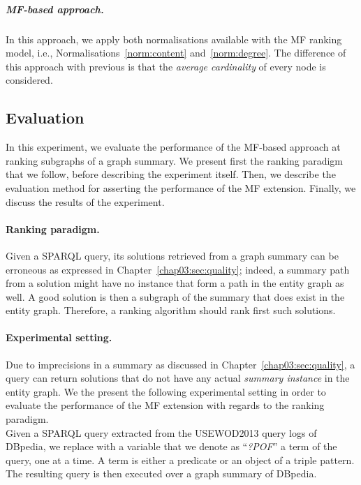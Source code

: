 \subparagraph{MF-based approach.}

In this approach, we apply both normalisations available with the MF ranking model, i.e., Normalisations~\ref{norm:content} and~\ref{norm:degree}. The difference of this approach with previous is that the \emph{average cardinality} of every node is considered.

\subsection{Evaluation}
\label{sec:summary-ranking:eval}

In this experiment, we evaluate the performance of the MF-based approach at ranking subgraphs of a graph summary. We present first the ranking paradigm that we follow, before describing the experiment itself. Then, we describe the evaluation method for asserting the performance of the MF extension. Finally, we discuss the results of the experiment.

\paragraph{Ranking paradigm.}

Given a SPARQL query, its solutions retrieved from a graph summary can be erroneous as expressed in Chapter~\ref{chap03:sec:quality}; indeed, a summary path from a solution might have no instance that form a path in the entity graph as well. A good solution is then a subgraph of the summary that does exist in the entity graph. Therefore, a ranking algorithm should rank first such solutions.

\paragraph{Experimental setting.}

Due to imprecisions in a summary as discussed in Chapter~\ref{chap03:sec:quality}, a query can return solutions that do not have any actual \emph{summary instance} in the entity graph. We the present the following experimental setting in order to evaluate the performance of the MF extension with regards to the ranking paradigm.\\

Given a SPARQL query extracted from the USEWOD2013 query logs of DBpedia, we replace with a variable that we denote as ``\emph{?POF}'' a term of the query, one at a time. A term is either a predicate or an object of a triple pattern. The resulting query is then executed over a graph summary of DBpedia.\\

